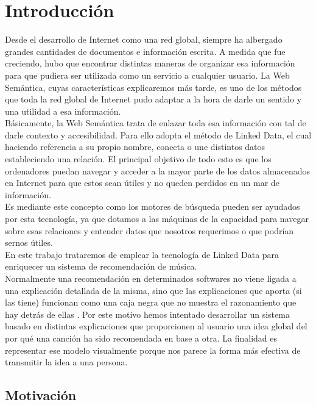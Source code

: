 \chapter{Introducción}
\label{cap:introduccion}

Desde el desarrollo de Internet como una red global, siempre ha albergado grandes cantidades de documentos e información escrita. A medida que fue creciendo, hubo que encontrar distintas maneras de organizar esa información para que pudiera ser utilizada como un servicio a cualquier usuario. La Web Semántica, cuyas características explicaremos más tarde, es uno de los métodos que toda la red global de Internet pudo adaptar a la hora de darle un sentido y una utilidad a esa información.\\

Básicamente, la Web Semántica trata de enlazar toda esa información con tal de darle contexto y accesibilidad. Para ello adopta el método de Linked Data, el cual haciendo referencia a su propio nombre, conecta o une distintos datos estableciendo una relación. El principal objetivo de todo esto es que los ordenadores puedan navegar y acceder a la mayor parte de los datos almacenados en Internet para que estos sean útiles y no queden perdidos en un mar de información.\\

Es mediante este concepto como los motores de búsqueda pueden ser ayudados por esta tecnología, ya que dotamos a las máquinas de la capacidad para navegar sobre esas relaciones y entender datos que nosotros requerimos o que podrían sernos útiles.\\

En este trabajo trataremos de emplear la tecnología de Linked Data para enriquecer un sistema de recomendación de música.\\

Normalmente una recomendación en determinados softwares no viene ligada a una explicación detallada de la misma, sino que las explicaciones que aporta (si las tiene) funcionan como una caja negra que no muestra el razonamiento que hay detrás de ellas \cite{tintarev2011}. Por este motivo hemos intentado desarrollar un sistema basado en distintas explicaciones que proporcionen al usuario una idea global del por qué una canción ha sido recomendada en base a otra. La finalidad es representar ese modelo visualmente porque nos parece la forma más efectiva de transmitir la idea a una persona.\\

\section{Motivación}

